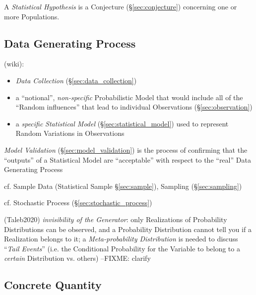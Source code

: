 A \emph{Statistical Hypothesis} is a Conjecture (\S\ref{sec:conjecture})
concerning one or more Populations.



\subsection{Data Generating Process}\label{sec:data_generating_process}

(wiki):

\begin{itemize}
  \item \emph{Data Collection} (\S\ref{sec:data_collection})
  \item a ``notional'', \emph{non-specific} Probabilistic Model
    that would include all of the ``Random influences'' that lead to individual
    Observations (\S\ref{sec:observation})
  \item a \emph{specific} \emph{Statistical Model}
    (\S\ref{sec:statistical_model}) used to represent Random Variations in
    Observations
\end{itemize}

\fist \emph{Model Validation} (\S\ref{sec:model_validation}) is the process of
confirming that the ``outputs'' of a Statistical Model are ``acceptable'' with
respect to the ``real'' Data Generating Process

\fist cf. Sample Data (Statistical Sample \S\ref{sec:sample}), Sampling
(\S\ref{sec:sampling})

\fist cf. Stochastic Process (\S\ref{sec:stochastic_process})

(Taleb2020) \emph{invisibility of the Generator}: only Realizations of
Probability Distributions can be observed, and a Probability Distribution cannot
tell you if a Realization belongs to it; a \emph{Meta-probability Distribution}
is needed to discuss ``\emph{Tail Events}'' (i.e. the Conditional Probability
for the Variable to belong to a \emph{certain} Distribution vs. others) --FIXME:
clarify



\subsection{Concrete Quantity}\label{sec:concrete_quantity}

